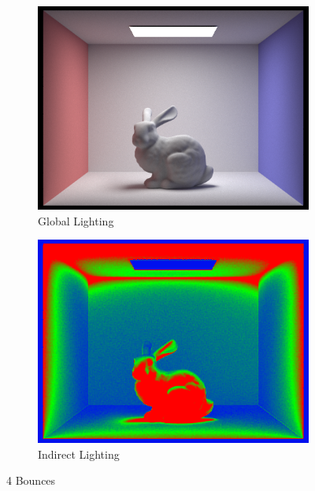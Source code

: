 \documentclass{article}
\begin{document}
\begin{figure}[htb!]
\begin{subfigure}[h]{0.4\textwidth}
\includegraphics[width=\textwidth]{task5/bunny2048.png}
\caption{Global Lighting}
\end{subfigure}
\hfill\vrule\hfill
\begin{subfigure}[h]{0.4\textwidth}
\includegraphics[width=\textwidth]{task5/bunny2048_rate.png}
\caption{Indirect Lighting}
\end{subfigure}%

\caption[f2]{4 Bounces}
\end{figure}
\end{document}
